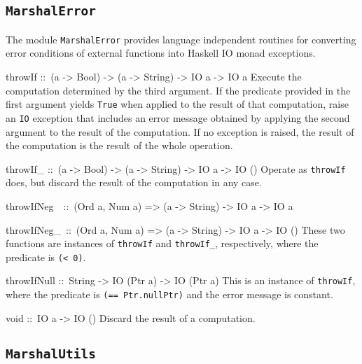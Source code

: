 \documentclass[a4paper,twosides]{article}
\makeatletter
\newcommand{\code}[1]{\texttt{#1}}      %
\newenvironment{codedesc}{%
  \list{}{\labelwidth\z@
    \let\makelabel\codedesclabel}
  }{%
  \endlist
  }
\newcommand*{\codedesclabel}[1]{%
  \hspace{-\leftmargin}
  \parbox[b]{\labelwidth}{\makebox[0pt][l]{\code{#1}}\\}\hfil\relax
  }
\newcommand{\combineitems}{\vspace*{-\itemsep}\vspace*{-\parsep}\vspace*{-1em}}
\makeatother
\begin{document}
\subsection{\code{MarshalError}}
\label{sec:MarshalError}

The module \code{MarshalError} provides language independent routines for
converting error conditions of external functions into Haskell IO monad
exceptions.
%
\begin{codedesc}
\item[throwIf ::\ (a -> Bool) -> (a -> String) -> IO a -> IO a] Execute the
  computation determined by the third argument.  If the predicate provided in
  the first argument yields \code{True} when applied to the result of that
  computation, raise an \code{IO} exception that includes an error message
  obtained by applying the second argument to the result of the computation.
  If no exception is raised, the result of the computation is the result of
  the whole operation.

\item[throwIf\_ ::\ (a -> Bool) -> (a -> String) -> IO a -> IO ()]
  Operate as \code{throwIf} does, but discard the result of the computation
  in any case.

\item[throwIfNeg~~::\ (Ord a, Num a) => (a -> String) -> IO a -> IO a]
\item[throwIfNeg\_~::\ (Ord a, Num a) => (a -> String) -> IO a -> IO ()]\combineitems
  These two functions are instances of \code{throwIf} and \code{throwIf\_},
  respectively, where the predicate is \code{(< 0)}.
  
\item[throwIfNull ::\ String -> IO (Ptr a) -> IO (Ptr a)] This is an instance
  of \code{throwIf}, where the predicate is \code{(== Ptr.nullPtr)} and the
  error message is constant.

\item[void ::\ IO a -> IO ()]
  Discard the result of a computation.
\end{codedesc}

\subsection{\code{MarshalUtils}}
\label{sec:MarshalUtils}
\end{document}
